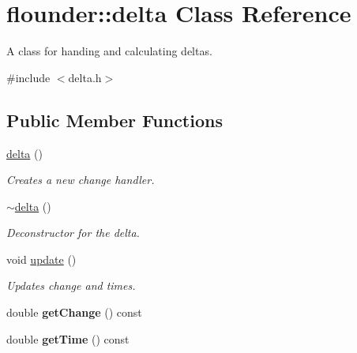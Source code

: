 \hypertarget{classflounder_1_1delta}{}\section{flounder\+:\+:delta Class Reference}
\label{classflounder_1_1delta}


A class for handing and calculating deltas.  




{\ttfamily \#include $<$delta.\+h$>$}

\subsection*{Public Member Functions}
\begin{DoxyCompactItemize}
\item 
\hyperlink{classflounder_1_1delta_a6996799d2f9423e994e2beb84dc3ba09}{delta} ()
\begin{DoxyCompactList}\small\item\em Creates a new change handler. \end{DoxyCompactList}\item 
\hyperlink{classflounder_1_1delta_af9eb174b15b3730a45a903e988dac1e8}{$\sim$delta} ()
\begin{DoxyCompactList}\small\item\em Deconstructor for the delta. \end{DoxyCompactList}\item 
void \hyperlink{classflounder_1_1delta_a6f87fd0b76d229ec490a07a565c2afd0}{update} ()
\begin{DoxyCompactList}\small\item\em Updates change and times. \end{DoxyCompactList}\item 
\mbox{\label{classflounder_1_1delta_a818f3ef5d9880ba40ddf3e8fbf46d167}} 
double {\bfseries get\+Change} () const
\item 
\mbox{\label{classflounder_1_1delta_a990036ef400a386d093cde0512803f3b}} 
double {\bfseries get\+Time} () const
\end{DoxyCompactItemize}
